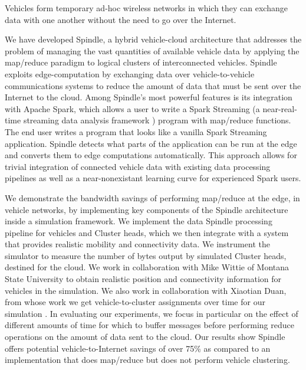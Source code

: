 \documentclass{thesis}
\begin{document}
    Vehicles form temporary ad-hoc wireless networks in which they can exchange
    data with one another without the need to go over the Internet.

    
    We have developed Spindle, a hybrid vehicle-cloud architecture that addresses the problem of 
    managing the vast quantities of available vehicle data by applying the map/reduce \cite{mapreduce}
    paradigm to logical clusters of interconnected vehicles. Spindle exploits edge-computation
    by exchanging data over vehicle-to-vehicle communications systems to reduce the amount of data
    that must be sent over the Internet to the cloud. Among Spindle's most powerful features is its
    integration with Apache Spark, which allows a user to write a Spark Streaming (a near-real-time streaming
    data analysis framework \cite{spark:streaming}) program with map/reduce functions. 
    The end user writes a program that looks like a vanilla Spark Streaming application.
    Spindle detects what parts of the application can be run at the edge and converts them to edge computations automatically. 
    This approach allows for trivial integration of connected vehicle data with existing data processing pipelines as well as a near-nonexistant learning curve for experienced Spark users.

    We demonstrate the bandwidth savings of performing map/reduce at the edge, in
    vehicle networks, by implementing key components of the Spindle architecture inside a simulation framework.
    We implement the data Spindle processing pipeline for vehicles and Cluster heads, which we then integrate
    with a system that provides realistic mobility and connectivity data. 
    We instrument the simulator to measure the number of bytes output by simulated Cluster heads,
    destined for the cloud. We work in collaboration with Mike Wittie of Montana State University to obtain
    realistic position and connectivity information for vehicles in the simulation. We also work in
    collaboration with Xiaotian Duan, from whose work we get vehicle-to-cluster assignments over time
    for our simulation \cite{xiaotian}. In evaluating our experiments, we focus in particular on the effect of different
    amounts of time for which to buffer messages before performing reduce operations
    on the amount of data sent to the cloud. 
    Our results show Spindle offers potential vehicle-to-Internet savings of over 75\% as
    compared to an implementation that does map/reduce but does not perform vehicle clustering.  
\end{document}
